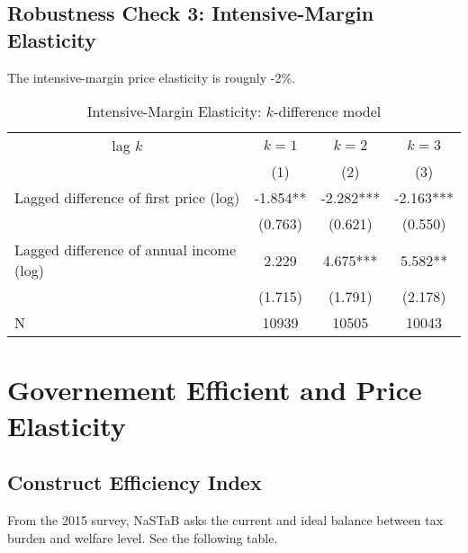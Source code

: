 \documentclass[ review  , 3p ]{elsarticle}
\begin{document}
  \hypertarget{robustness-check-3-intensive-margin-elasticity}{%
  \subsection{Robustness Check 3: Intensive-Margin Elasticity}\label{robustness-check-3-intensive-margin-elasticity}}

  The intensive-margin price elasticity is rougnly -2\%.

  \begin{table}

  \caption{\label{tab:kablekDiffElasticitySlide2}Intensive-Margin Elasticity: $k$-difference model}
  \centering
  \fontsize{8}{10}\selectfont
  \begin{tabular}[t]{lccc}
  \toprule
  \multicolumn{1}{c}{lag $k$} & \multicolumn{1}{c}{$k = 1$} & \multicolumn{1}{c}{$k = 2$} & \multicolumn{1}{c}{$k = 3$} \\
  \cmidrule(l{3pt}r{3pt}){1-1} \cmidrule(l{3pt}r{3pt}){2-2} \cmidrule(l{3pt}r{3pt}){3-3} \cmidrule(l{3pt}r{3pt}){4-4}
   & (1) & (2) & (3)\\
  \midrule
  Lagged difference of first price (log) & -1.854** & -2.282*** & -2.163***\\
   & (0.763) & (0.621) & (0.550)\\
  Lagged difference of annual income (log) & 2.229 & 4.675*** & 5.582**\\
   & (1.715) & (1.791) & (2.178)\\
  N & 10939 & 10505 & 10043\\
  \bottomrule
  \end{tabular}
  \end{table}

  \hypertarget{governement-efficient-and-price-elasticity}{%
  \section{Governement Efficient and Price Elasticity}\label{governement-efficient-and-price-elasticity}}

  \hypertarget{construct-efficiency-index}{%
  \subsection{Construct Efficiency Index}\label{construct-efficiency-index}}

  From the 2015 survey, NaSTaB asks the current and ideal balance between tax burden and welfare level.
  See the following table.
\end{document}
